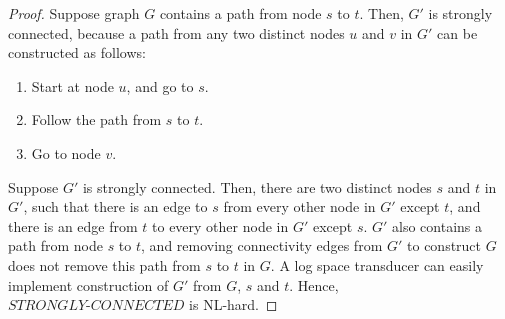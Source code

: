 \documentclass[11pt]{article}
\begin{document}
\begin{proof}
Suppose graph $G$ contains a path from node $s$ to $t$. Then, $G'$ is strongly connected, because a path from any two distinct nodes $u$ and $v$ in $G'$ can be constructed as follows:
\begin{enumerate}
\item Start at node $u$, and go to $s$.
\item Follow the path from $s$ to $t$.
\item Go to node $v$.
\end{enumerate}

Suppose $G'$ is strongly connected. Then, there are two distinct nodes $s$ and $t$ in $G'$, such that there is an edge to $s$ from every other node in $G'$ except $t$, and there is an edge from $t$ to every other node in $G'$ except $s$. $G'$ also contains a path from node $s$ to $t$, and removing connectivity edges from $G'$ to construct $G$ does not remove this path from $s$ to $t$ in $G$. A log space transducer can easily implement construction of $G'$ from $G$, $s$ and $t$. Hence, $STRONGLY\text{-}CONNECTED$ is NL-hard.
\end{proof}
\end{document}
